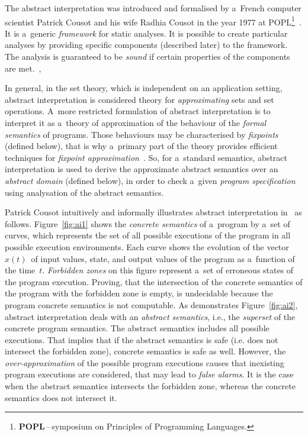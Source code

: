 The abstract interpretation was introduced and formalised by a~French
computer scientist Patrick Cousot and his wife Radhia Cousot in the year
1977 at POPL\footnote{\textbf{POPL}\,--\,symposium on Principles of Programming
Languages.}~\cite{AILatticeModelCousot}. It is a~generic \emph{framework}
for static analyses. It is possible to create particular analyses by
providing specific components (described later) to the framework. The
analysis is guaranteed to be \emph{sound} if certain properties of the
components are met.~\cite{favAI}, \cite{projectPracticeMarcin2018}

In general, in the set theory, which is independent on an application
setting, abstract interpretation is considered theory for
\emph{approximating} sets and set operations. A~more restricted formulation
of abstract interpretation is to interpret it as a~theory of approximation
of the behaviour of the \emph{formal semantics} of programs. Those
behaviours may be characterised by \emph{fixpoints} (defined below), that is
why a~primary part of the theory provides efficient techniques for
\emph{fixpoint approximation}~\cite{programAnalysisNielson}.
So, for a~standard semantics, abstract interpretation is used to derive
the approximate abstract semantics over an \emph{abstract domain} (defined
below), in order to check a~given \emph{program specification} using
analysation of the abstract semantics.~\cite{AIBasedFormalMethodsCousot}

Patrick Cousot intuitively and informally illustrates abstract
interpretation in~\cite{AIInNutshellCousot} as follows.
Figure~\ref{fig:ai1} shows the \emph{concrete semantics} of a~program
by a~set of curves, which represents the set of all possible executions
of the program in all possible execution environments. Each curve shows
the evolution of the vector~$ x(t) $~of input values, state, and
output values of the program as a~function of the time~$ t $.
\emph{Forbidden zones} on this figure represent a~set of erroneous states
of the program execution. Proving, that the intersection of the concrete
semantics of the program with the forbidden zone is empty, is undecidable
because the program concrete semantics is not computable. As demonstrates
Figure~\ref{fig:ai2}, abstract interpretation deals with an
\emph{abstract semantics}, i.e., the \emph{superset} of the concrete
program semantics. The abstract semantics includes all possible executions.
That implies that if the abstract semantics is safe (i.e. does not
intersect the forbidden zone), concrete semantics is safe as well. However,
the \emph{over-approximation} of the possible program executions causes
that inexisting program executions are considered, that may lead to
\emph{false alarms}. It is the case when the abstract semantics
intersects the forbidden zone, whereas the concrete semantics does not
intersect it.

